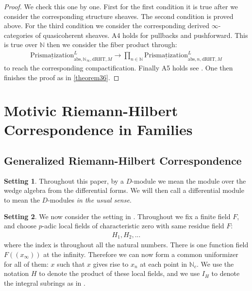\documentclass[12pt]{article}
\theoremstyle{definition}
\newtheorem{setting}{Setting}
\begin{document}
\begin{proof}
We check this one by one. First for the first condition it is true after we consider the corresponding structure sheaves. The second condition is proved above. For the third condition we consider the corresponding derived $\infty$-categories of quasicoherent sheaves. A4 holds for pullbacks and pushforward. This is true over $\mathbb{N}$ then we consider the fiber product through:
\begin{align}
{\underline{\mathrm{Prismatization}}}^L_{\mathrm{abs},\mathbb{N}_\infty,\mathrm{dRHT},M}\rightarrow  \prod_{n\in \mathbb{N}} {\underline{\mathrm{Prismatization}}}^L_{\mathrm{abs},n,\mathrm{dRHT},M}
\end{align}
to reach the corresponding compactification. Finally A5 holds see \cite[Chapter 4, in particular 4.7, 4.8, 4.9, 4.10]{3A}. One then finishes the proof as in \cref{theorem36}.
\end{proof}





\newpage
\section{Motivic Riemann-Hilbert Correspondence in Families}


\subsection{Generalized Riemann-Hilbert Correspondence}

\begin{setting}
Throughout this paper, by a $D$-module we mean the module over the wedge algebra from the differential forms. We will then call a differential module to mean the $D$-modules \textit{in the usual sense}. 
\end{setting}

\begin{setting}
We now consider the setting in \cite{5LH}. Throughout we fix a finite field $F$, and choose $p$-adic local fields of characteristic zero with same residue field $F$:
\begin{align}
H_1,H_2,...
\end{align}
where the index is throughout all the natural numbers. There is one function field $F((x_\infty))$ at the infinity. Therefore we can now form a common uniformizer for all of them: $x$ such that $x$ gives rise to $x_n$ at each point in $\mathbb{N}_c$. We use the notation $H$ to denote the product of these local fields, and we use $I_H$ to denote the integral subrings as in \cite{5LH}.
\end{setting}
\end{document}
